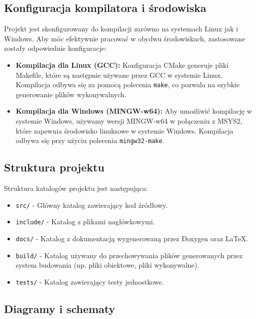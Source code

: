 \subsection{Konfiguracja kompilatora i środowiska}

Projekt jest skonfigurowany do kompilacji zarówno na systemach Linux jak i Windows. Aby móc efektywnie pracować w obydwu środowiskach, zastosowane zostały odpowiednie konfiguracje:

\begin{itemize}
	\item \textbf{Kompilacja dla Linux (GCC):} Konfiguracja CMake generuje pliki Makefile, które są następnie używane przez GCC w systemie Linux. Kompilacja odbywa się za pomocą polecenia \texttt{make}, co pozwala na szybkie generowanie plików wykonywalnych.
	\item \textbf{Kompilacja dla Windows (MINGW-w64):} Aby umożliwić kompilację w systemie Windows, używamy wersji MINGW-w64 w połączeniu z MSYS2, które zapewnia środowisko linuksowe w systemie Windows. Kompilacja odbywa się przy użyciu polecenia \texttt{mingw32-make}.
\end{itemize}

\subsection{Struktura projektu}

Struktura katalogów projektu jest następująca:

\begin{itemize}
	\item \texttt{src/} - Główny katalog zawierający kod źródłowy.
	\item \texttt{include/} - Katalog z plikami nagłówkowymi.
	\item \texttt{docs/} - Katalog z dokumentacją wygenerowaną przez Doxygen oraz LaTeX.
	\item \texttt{build/} - Katalog używany do przechowywania plików generowanych przez system budowania (np. pliki obiektowe, pliki wykonywalne).
	\item \texttt{tests/} - Katalog zawierający testy jednostkowe.
\end{itemize}

\subsection{Diagramy i schematy}


